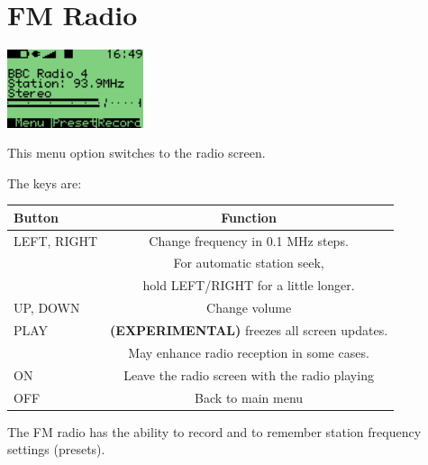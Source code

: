 \section{\label{ref:FMradio}FM Radio}
\begin{center}
  \includegraphics[width=4cm]{main_menu/images/ss-fm-radio-screen-112x64x1.png}
\end{center}
This menu option switches to the radio screen. 

The keys are:

\begin{table}[h!]
  \begin{center}
    \begin{tabular}{@{}lc@{}}\toprule
      \textbf{Button} & \textbf{Function} \\\midrule
      LEFT, RIGHT & Change frequency in 0.1 MHz steps. \\
                  & For automatic station seek, \\
                  & hold LEFT/RIGHT for a little longer. \\
      UP, DOWN & Change volume \\
      PLAY & \textbf{(EXPERIMENTAL)} freezes all screen updates.\\
           & May enhance radio reception in some cases. \\
      ON & Leave the radio screen with the radio playing \\
      OFF & Back to main menu \\\bottomrule
    \end{tabular}
  \end{center}
\end{table}
The FM radio has the ability to record and to remember station frequency settings (presets).

